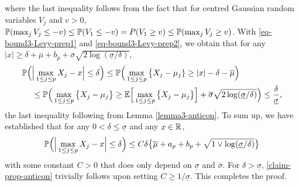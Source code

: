 \documentclass[a4paper,12pt]{article}
\begin{document}
where the last inequality follows from the fact that for centred Gaussian random variables $V_j$ and $v > 0$, $\mathbb{P}(\max_j V_j \le -v) \le \mathbb{P}(V_1 \le -v) = P(V_1 \ge v) \le \mathbb{P}(\max_j V_j \ge v)$. With \eqref{eq-bound3-Levy-prep1} and \eqref{eq-bound3-Levy-prep2}, we obtain that for any $|x| \ge \delta + \overline{\mu} + b_p + \overline{\sigma}\sqrt{2\log(\underline{\sigma}/\delta)}$,
\begin{align*} 
\mathbb{P} \Big( & \Big| \max_{1 \le j \le p} X_j - x \Big| \le \delta \Big) \le \mathbb{P} \Big( \max_{1 \le j \le p} \big\{ X_j - \mu_j \} \ge |x| - \delta - \overline{\mu} \Big) \\
 & \le \mathbb{P} \Big( \max_{1 \le j \le p} \big\{ X_j - \mu_j \big\} \ge \mathbb{E} \Big[ \max_{1 \le j \le p} \big\{ X_j-\mu_j \big\} \Big] + \overline{\sigma} \sqrt{2\log(\underline{\sigma}/\delta)} \Big) \le \frac{\delta}{\underline{\sigma}}, 
\end{align*}
the last inequality following from Lemma \ref{lemma3-anticon}. To sum up, we have established that for any $0 < \delta \le \underline{\sigma}$ and any $x \in \mathbb{R}$, 
\begin{equation}\label{claim-prop-anticon}
\mathbb{P} \Big( \Big| \max_{1 \le j \le p} X_j - x \Big| \le \delta \Big) \le C \delta \big\{ \overline{\mu} + a_p + b_p + \sqrt{1 \vee \log(\underline{\sigma}/\delta)} \big\} 
\end{equation}
with some constant $C > 0$ that does only depend on $\underline{\sigma}$ and $\overline{\sigma}$. For $\delta > \underline{\sigma}$, \eqref{claim-prop-anticon} trivially follows upon setting $C \ge 1/\underline{\sigma}$. This completes the proof. 




{\small
\setlength{\bibsep}{0.55em}
}
\end{document}

